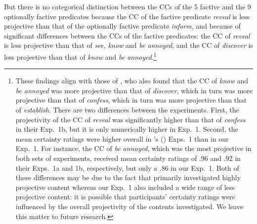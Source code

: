 \documentclass[11pt,fleqn]{article}
\newcommand{\6}{\mbox{$[\hspace*{-.6mm}[$}}
\newcommand{\9}{\mbox{$]\hspace*{-.6mm}]$}}
\newcommand{\citetpos}[1]{\citeauthor{#1}'s (\citeyear{#1})}
\begin{document}
 But there is no categorical distinction between the CCs of the 5 factive and the 9 optionally factive predicates because the CC of the factive predicate {\em reveal} is less projective than that of the optionally factive predicate {\em inform}, and because of significant differences between the CCs of the factive predicates: the CC of {\em reveal} is less projective than that of {\em see, know} and {\em be annoyed}, and the CC of {\em discover} is less projective than that of {\em know} and {\em be annoyed}.\footnote{These findings align with those of \citealt{tbd-variability}, who also found that the CC of {\em know} and {\em be annoyed} was more projective than that of {\em discover}, which in turn was more projective than that of {\em confess}, which in turn was more projective than that of {\em establish}. There are two differences between the experiments. First, the projectivity of the CC of {\em reveal} was significantly higher than that of {\em confess} in their Exp.~1b, but it is only numerically higher in Exp.~1. Second, the mean certainty ratings were higher overall in \citetpos{tbd-variability} Exps.~1 than in our Exp.~1. For instance, the CC of {\em be annoyed}, which was the most projective in both sets of experiments, received mean certainty ratings of .96  and .92 in their Exps.~1a and 1b, respectively, but only a .86 in our Exp.~1. Both of these differences may be due to the fact that \citet{tbd-variability} primarily investigated highly projective content whereas our Exp.~1 also included a wide range of less projective content: it is possible that participants' certainty ratings were influenced by the overall projectivity of the contents investigated. We leave this matter to future research.} 
\end{document}
